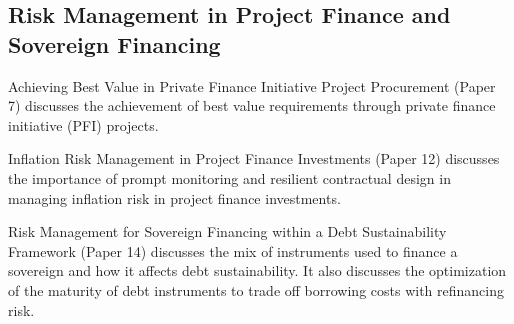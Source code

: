 \documentclass{article}
\begin{document}
\subsection{Risk Management in Project Finance and Sovereign Financing}

Achieving Best Value in Private Finance Initiative Project Procurement (Paper 7) discusses the achievement of best value requirements through private finance initiative (PFI) projects.

Inflation Risk Management in Project Finance Investments (Paper 12) discusses the importance of prompt monitoring and resilient contractual design in managing inflation risk in project finance investments.

Risk Management for Sovereign Financing within a Debt Sustainability Framework (Paper 14) discusses the mix of instruments used to finance a sovereign and how it affects debt sustainability. It also discusses the optimization of the maturity of debt instruments to trade off borrowing costs with refinancing risk.





%
%

\end{document}

